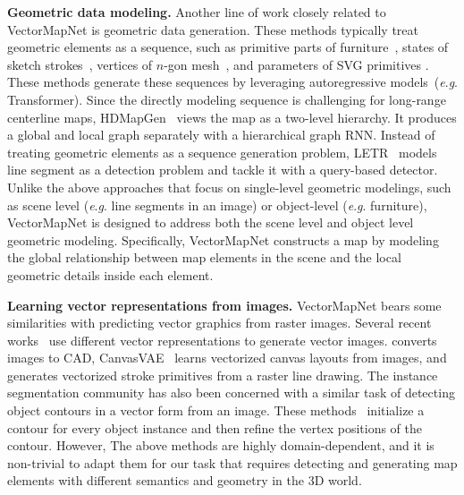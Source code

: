 \documentclass{article}
\newcommand{\eg}{\textit{e}.\textit{g}. }
\theoremstyle{plain}
\theoremstyle{definition}
\theoremstyle{remark}
\begin{document}
\noindent\textbf{Geometric data modeling.}
Another line of work closely related to VectorMapNet is geometric data generation. These methods typically treat geometric elements as a sequence, such as primitive parts of furniture~\citep{li2017grass,mo2019structurenet}, states of sketch strokes~\citep{ha2017neural}, vertices of $n$-gon mesh~\citep{nash2020polygen}, and parameters of SVG primitives \citep{carlier2020deepsvg}.
These methods generate these sequences by leveraging autoregressive models~(\eg Transformer). 
Since the directly modeling sequence is challenging for long-range centerline maps, HDMapGen~\citep{mi2021hdmapgen} views the map as a two-level hierarchy. 
It produces a global and local graph separately with a hierarchical graph RNN. Instead of treating geometric elements as a sequence generation problem, LETR~\citep{xu2021line} models line segment as a detection problem and tackle it with a query-based detector. 
Unlike the above approaches that focus on single-level geometric modelings, such as scene level (\eg line segments in an image) or object-level (\eg furniture), VectorMapNet is designed to address both the scene level and object level geometric modeling. Specifically, VectorMapNet constructs a map by modeling the global relationship between map elements in the scene and the local geometric details inside each element.

\noindent\textbf{Learning vector representations from images.}
VectorMapNet bears some similarities with predicting vector graphics from raster images. Several recent works~\citep{carlier2020deepsvg,reddy2021im2vec} use different vector representations to generate vector images. \citep{ganin2021computer} converts images to CAD, CanvasVAE~\citep{yamaguchi2021canvasvae} learns vectorized canvas layouts from images, and \citep{liu2022end} generates vectorized stroke primitives from a raster line drawing.
The instance segmentation community has also been concerned with a similar task of detecting object contours in a vector form from an image. These methods~\citep{acuna2018efficient,liang2020polytransform,castrejon2017annotating,zorzi2022polyworld,zhang2019jointnet} initialize a contour for every object instance and then refine the vertex positions of the contour.
However, The above methods are highly domain-dependent, and it is non-trivial to adapt them for our task that requires detecting and generating map elements with different semantics and geometry in the 3D world. 
\end{document}

